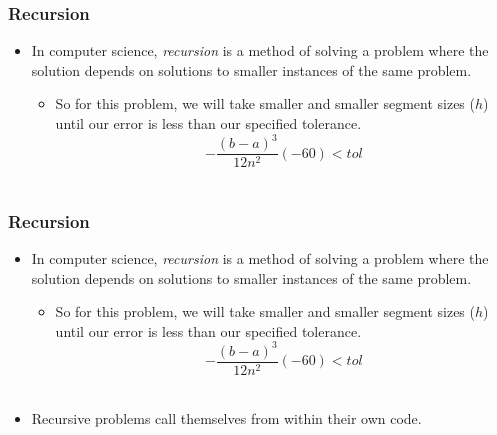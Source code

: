 \documentclass{if-beamer}
\begin{document}
\begin{frame}[t]
	\frametitle{Recursion}
	\begin{itemize}
		\item In computer science, \textit{recursion} is a method of solving a problem where the solution depends on solutions to smaller instances of the same problem. \\\vspace{10pt}
		\begin{itemize}
			\item So for this problem, we will take smaller and smaller segment sizes ($h$) until our error is less than our specified tolerance.$$-\frac{(b-a)^3}{12n^2}(-60) < tol $$\\\vspace{10pt}
		\end{itemize}
	\end{itemize}
\end{frame}

\begin{frame}[t]
	\frametitle{Recursion}
	\begin{itemize}
		\item In computer science, \textit{recursion} is a method of solving a problem where the solution depends on solutions to smaller instances of the same problem. \\\vspace{10pt}
		\begin{itemize}
			\item So for this problem, we will take smaller and smaller segment sizes ($h$) until our error is less than our specified tolerance.$$-\frac{(b-a)^3}{12n^2}(-60) < tol $$\\\vspace{10pt}
		\end{itemize}
		\item Recursive problems call themselves from within their own code. \\\vspace{10pt} 
	\end{itemize}
\end{frame}
\end{document}
